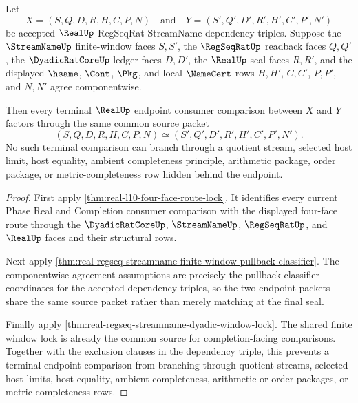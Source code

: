 \begin{theorem}
\label{thm:real-regseq-streamname-terminal-common-source-lock}
Let
$$
X=(S,Q,D,R,H,C,P,N)
\quad\text{and}\quad
Y=(S',Q',D',R',H',C',P',N')
$$
be accepted $\RealUp$ RegSeqRat StreamName dependency triples. Suppose the
$\StreamNameUp$ finite-window faces $S,S'$, the $\RegSeqRatUp$ readback faces
$Q,Q'$, the $\DyadicRatCoreUp$ ledger faces $D,D'$, the $\RealUp$ seal faces
$R,R'$, and the displayed $\hsame$, $\Cont$, $\Pkg$, and local $\NameCert$
rows $H,H'$, $C,C'$, $P,P'$, and $N,N'$ agree componentwise.

Then every terminal $\RealUp$ endpoint consumer comparison between $X$ and
$Y$ factors through the same common source packet
$$
(S,Q,D,R,H,C,P,N)\simeq(S',Q',D',R',H',C',P',N').
$$
No such terminal comparison can branch through a quotient stream, selected
host limit, host equality, ambient completeness principle, arithmetic
package, order package, or metric-completeness row hidden behind the endpoint.
\end{theorem}
\begin{proof}
First apply \autoref{thm:real-l10-four-face-route-lock}. It identifies every
current Phase Real and Completion consumer comparison with the displayed
four-face route through the $\DyadicRatCoreUp$, $\StreamNameUp$,
$\RegSeqRatUp$, and $\RealUp$ faces and their structural rows.

Next apply
\autoref{thm:real-regseq-streamname-finite-window-pullback-classifier}. The
componentwise agreement assumptions are precisely the pullback classifier
coordinates for the accepted dependency triples, so the two endpoint packets
share the same source packet rather than merely matching at the final seal.

Finally apply
\autoref{thm:real-regseq-streamname-dyadic-window-lock}. The shared finite
window lock is already the common source for completion-facing comparisons.
Together with the exclusion clauses in the dependency triple, this prevents a
terminal endpoint comparison from branching through quotient streams, selected
host limits, host equality, ambient completeness, arithmetic or order
packages, or metric-completeness rows.
\end{proof}

